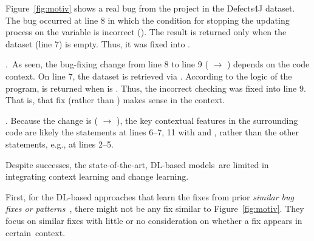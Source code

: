 Figure~\ref{fig:motiv} shows a real bug from the project 
in the Defects4J dataset. The bug occurred at line 8 in which the
condition for stopping the updating process on the 
variable is incorrect (). The result is
returned only when the dataset (line 7) is empty. Thus, it was fixed
into .


.~As
seen, the bug-fixing change from line 8 to line 9 ( $\rightarrow$ ) depends on the
code context.
On line 7, the dataset is retrieved via . According
to the logic of the program,  is returned when
 is .  Thus, the incorrect checking was fixed
into line 9. That is, that fix  (rather
than ) makes sense in the context.


\vspace{2pt}
.
Because the change is ( \code{!=} 
$\rightarrow$  \code{==} ), the key
contextual features in the surrounding code are likely the statements
at lines 6--7, 11 with  and , rather
than the other statements, e.g., at lines 2--5.


Despite successes, the state-of-the-art, DL-based models~are
limited in integrating context learning and change learning.

First, for the DL-based approaches that learn the fixes
from prior {\em similar bug fixes or
  patterns}~\cite{gupta2017deepfix,white2019sorting,white2016deep},
there might not be any fix similar to Figure~\ref{fig:motiv}. They focus
on similar fixes with little or no consideration on whether a fix
appears in certain~context.

